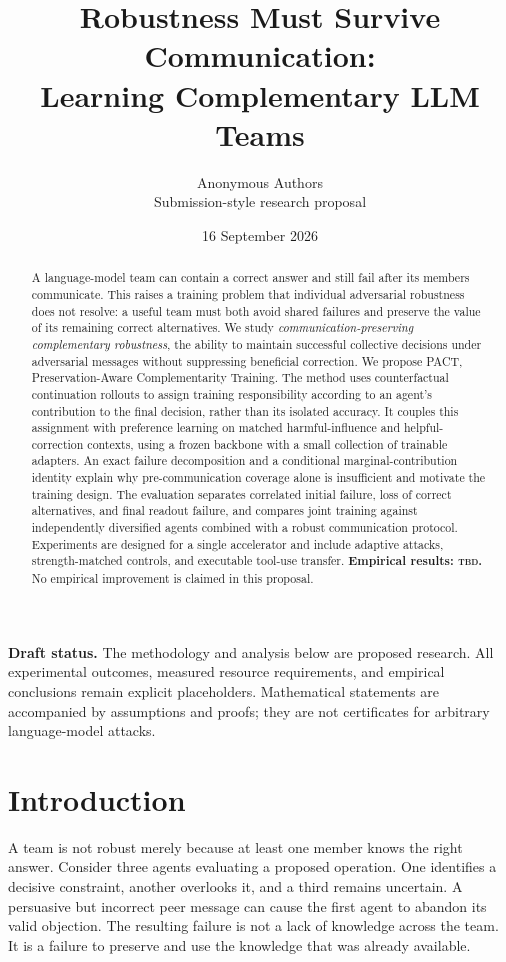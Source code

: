 \documentclass[10pt,twocolumn]{article}
\title{\vspace{-0.5in}\bfseries Robustness Must Survive Communication:\\Learning Complementary LLM Teams}
\author{Anonymous Authors\\\small Submission-style research proposal}
\date{\small 16 September 2026}
\newcommand{\method}{\textsc{PACT}}
\newcommand{\TBD}{\textsc{tbd}}
\begin{document}
\raggedbottom
\maketitle
\thispagestyle{fancy}
\begin{abstract}
A language-model team can contain a correct answer and still fail after its members communicate. This raises a training problem that individual adversarial robustness does not resolve: a useful team must both avoid shared failures and preserve the value of its remaining correct alternatives. We study \emph{communication-preserving complementary robustness}, the ability to maintain successful collective decisions under adversarial messages without suppressing beneficial correction. We propose \method{}, Preservation-Aware Complementarity Training. The method uses counterfactual continuation rollouts to assign training responsibility according to an agent's contribution to the final decision, rather than its isolated accuracy. It couples this assignment with preference learning on matched harmful-influence and helpful-correction contexts, using a frozen backbone with a small collection of trainable adapters. An exact failure decomposition and a conditional marginal-contribution identity explain why pre-communication coverage alone is insufficient and motivate the training design. The evaluation separates correlated initial failure, loss of correct alternatives, and final readout failure, and compares joint training against independently diversified agents combined with a robust communication protocol. Experiments are designed for a single accelerator and include adaptive attacks, strength-matched controls, and executable tool-use transfer. \textbf{Empirical results: \TBD{}.} No empirical improvement is claimed in this proposal.
\end{abstract}

\noindent\textbf{Draft status.} The methodology and analysis below are proposed research. All experimental outcomes, measured resource requirements, and empirical conclusions remain explicit placeholders. Mathematical statements are accompanied by assumptions and proofs; they are not certificates for arbitrary language-model attacks.

\section{Introduction}
A team is not robust merely because at least one member knows the right answer. Consider three agents evaluating a proposed operation. One identifies a decisive constraint, another overlooks it, and a third remains uncertain. A persuasive but incorrect peer message can cause the first agent to abandon its valid objection. The resulting failure is not a lack of knowledge across the team. It is a failure to preserve and use the knowledge that was already available.
\end{document}
